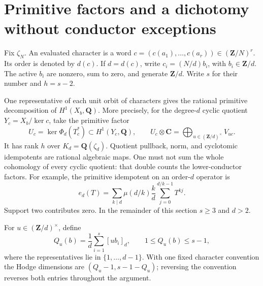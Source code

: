 \documentclass[11pt]{article}
\theoremstyle{remark}\newtheorem{remark}[theorem]{Remark}
\newcommand{\Q}{\mathbf Q}\newcommand{\C}{\mathbf C}
\newcommand{\Z}{\mathbf Z}\newcommand{\PP}{\mathbf P}
\begin{document}
\section{Primitive factors and a dichotomy without conductor exceptions}
Fix $\zeta_N$. An evaluated character is a word
$c=(c(a_1),\ldots,c(a_r))\in(\Z/N)^r$. Its order is denoted by $d(c)$.
If $d=d(c)$, write $c_i=(N/d)b_i$, with $b_i\in\Z/d$.
The active $b_i$ are nonzero, sum to zero, and generate $\Z/d$.
Write $s$ for their number and $h=s-2$.

One representative of each unit orbit of characters gives the rational
primitive decomposition of $H^1(X_b,\Q)$. More precisely, for the degree-$d$
cyclic quotient $Y_c=X_b/\ker c$, take the primitive factor
\[
 U_c=\ker\Phi_d(T_c^*)\subset H^1(Y_c,\Q),
 \qquad
 U_c\otimes\C=\bigoplus_{u\in(\Z/d)^\times}V_{uc}.
\]
It has rank $h$ over $K_d=\Q(\zeta_d)$. Quotient pullback, norm, and
cyclotomic idempotents are rational algebraic maps. One must not sum the
whole cohomology of every cyclic quotient: that double counts the
lower-conductor factors. For example, the primitive idempotent on an
order-$d$ operator is
\[
 e_d(T)=\sum_{k\mid d}\mu(d/k)\frac{k}{d}
                 \sum_{j=0}^{d/k-1}T^{kj}.
\]
Support two contributes zero. In the remainder of this section $s\geq3$
and $d>2$.

For $u\in(\Z/d)^\times$, define
\[
 Q_u(b)=\frac1d\sum_{i=1}^s[ub_i]_d,
 \qquad 1\leq Q_u(b)\leq s-1,
\]
where the representatives lie in $\{1,\ldots,d-1\}$. With one fixed
character convention the Hodge dimensions are
$(Q_u-1,s-1-Q_u)$; reversing the convention reverses both entries
throughout the argument.
\end{document}
